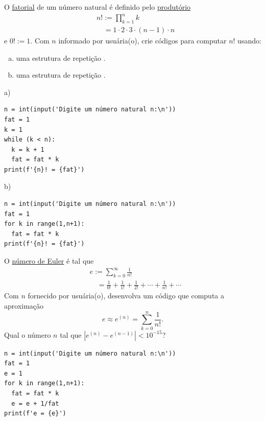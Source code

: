 \begin{exer}
  O \href{https://pt.wikipedia.org/wiki/Fatorial}{fatorial} de um número natural é definido pelo \href{https://pt.wikipedia.org/wiki/Produt\%C3\%B3rio}{produtório}
  \begin{align}
    & n! := \prod_{k=1}^{n}k \\
    & \text{}\quad = 1\cdot 2\cdot 3 \cdot (n-1)\cdot n
  \end{align}
  e $0! := 1$. Com $n$ informado por usuária(o), crie códigos para computar $n!$ usando:
  \begin{enumerate}[a)]
  \item uma estrutura de repetição {\PYTHONwhile}.
  \item uma estrutura de repetição {\PYTHONfor}.
  \end{enumerate}
\end{exer}
\begin{resp}
  a)

\begin{lstlisting}
n = int(input('Digite um número natural n:\n'))
fat = 1
k = 1
while (k < n):
  k = k + 1
  fat = fat * k
print(f'{n}! = {fat}')
\end{lstlisting}

b)

\begin{lstlisting}
n = int(input('Digite um número natural n:\n'))
fat = 1
for k in range(1,n+1):
  fat = fat * k
print(f'{n}! = {fat}')
\end{lstlisting}

\end{resp}

\begin{exer}
  O \href{https://pt.wikipedia.org/wiki/E_(constante_matem\%C3\%A1tica)}{número de Euler}{\euler} é tal que
  \begin{align}
    & e := \sum_{k=0}^\infty \frac{1}{n!} \\
    & \text{}\quad = \frac{1}{0!} + \frac{1}{1!} + \frac{1}{2!} + \cdots + \frac{1}{n!} + \cdots
  \end{align}
  Com $n$ fornecido por usuária(o), desenvolva um código que computa a aproximação
  \begin{equation}
    e \approx e^{(n)} = \sum_{k=0}^n \frac{1}{n!}.
  \end{equation}
  Qual o número $n$ tal que $\left|e^{(n)} - e^{(n-1)}\right|<10^{-15}$?
\end{exer}
\begin{resp}

\begin{lstlisting}
n = int(input('Digite um número natural n:\n'))
fat = 1
e = 1
for k in range(1,n+1):
  fat = fat * k
  e = e + 1/fat
print(f'e = {e}')
\end{lstlisting}

\end{resp}

